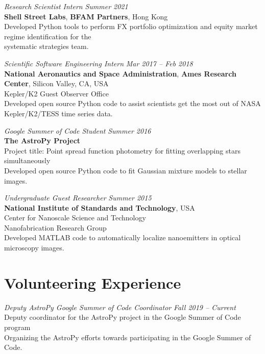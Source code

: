 \documentclass[10pt]{article}
\begin{document}
\begin{titlepage}
\emph{Research Scientist Intern} \hfill \textit{Summer 2021}
  \\\textbf{Shell Street Labs}, \textbf{BFAM Partners}, Hong Kong
  \\ {\small Developed \textsf{Python} tools to perform FX portfolio optimization and equity market regime identification for the}
  \\ {\small  systematic strategies team.}
\vspace{.5cm}


\emph{Scientific Software Engineering Intern} \hfill \textit{Mar 2017 -- Feb 2018}
\\\textbf{National Aeronautics and Space Administration}, \textbf{Ames Research Center}, Silicon Valley, CA, USA
\\Kepler/K2 Guest Observer Office
\\ {\small Developed open source \textsf{Python} code
    to assist scientists get the most out of NASA Kepler/K2/TESS time series data.}
\vspace{.5cm}

\emph{Google Summer of Code Student} \hfill \textit{Summer 2016}
\\\textbf{The AstroPy Project}
\\ Project title: Point spread function photometry for fitting overlapping stars simultaneously
\\ {\small Developed open source \textsf{Python} code
    to fit Gaussian mixture models to stellar images.}
\vspace{.5cm}

\emph{Undergraduate Guest Researcher} \hfill \textit{Summer 2015}
\\\textbf{National Institute of Standards and Technology}, USA
\\Center for Nanoscale Science and Technology
\\Nanofabrication Research Group
\\ {\small Developed \textsf{MATLAB} code to automatically localize nanoemitters in optical microscopy images.}


\section*{Volunteering Experience}
\emph{Deputy AstroPy Google Summer of Code Coordinator} \hfill \textit{Fall 2019 -- Current}
\\Deputy coordinator for the AstroPy project in the Google Summer of Code program
\\ {\small Organizing the AstroPy efforts towards participating in the Google Summer of Code.}
\vspace{.5cm}


\end{titlepage}
\end{document}
